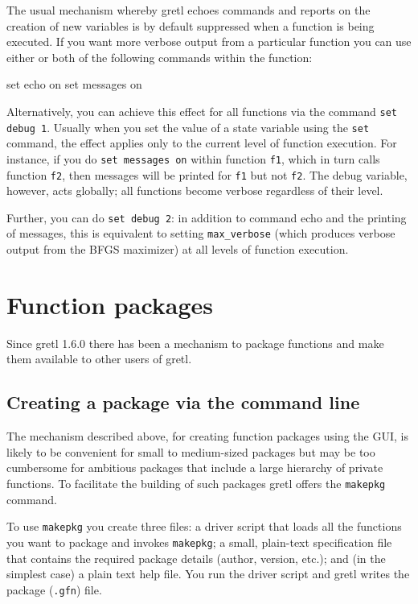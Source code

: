 The usual mechanism whereby gretl echoes commands and reports on
the creation of new variables is by default suppressed when a function
is being executed.  If you want more verbose output from a particular
function you can use either or both of the following commands within
the function:
%
\begin{code}
set echo on
set messages on
\end{code}

Alternatively, you can achieve this effect for all functions via
the command \texttt{set debug 1}.  Usually when you set the value of a
state variable using the \texttt{set} command, the effect applies only
to the current level of function execution.  For instance, if you do
\texttt{set messages on} within function \texttt{f1}, which in turn
calls function \texttt{f2}, then messages will be printed for
\texttt{f1} but not \texttt{f2}.  The debug variable, however, acts
globally; all functions become verbose regardless of their level.

Further, you can do \texttt{set debug 2}: in addition to command echo
and the printing of messages, this is equivalent to setting
\verb|max_verbose| (which produces verbose output from the BFGS
maximizer) at all levels of function execution.

\section{Function packages}
\label{sec:func-packages}

Since gretl 1.6.0 there has been a mechanism to package
functions and make them available to other users of gretl.  

\subsection{Creating a package via the command line}

The mechanism described above, for creating function packages using
the GUI, is likely to be convenient for small to medium-sized packages
but may be too cumbersome for ambitious packages that include a large
hierarchy of private functions. To facilitate the building of such
packages gretl offers the \texttt{makepkg} command.

To use \texttt{makepkg} you create three files: a driver script that
loads all the functions you want to package and invokes
\texttt{makepkg}; a small, plain-text specification file that contains
the required package details (author, version, etc.); and (in the
simplest case) a plain text help file.  You run the driver script and
gretl writes the package (\texttt{.gfn}) file.

